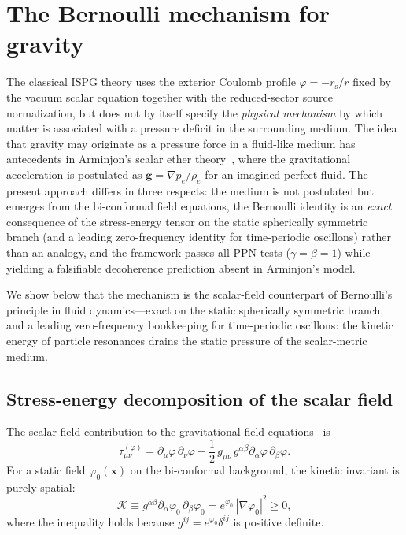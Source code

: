 \documentclass[aps,prd,onecolumn,superscriptaddress,nofootinbib,showpacs,12pt,notitlepage]{revtex4-2}
\newcommand{\rs}{r_{\mathrm{s}}}
\begin{document}
\section{The Bernoulli mechanism for gravity}\label{sec:bernoulli_identity}

The classical ISPG theory uses the exterior Coulomb profile
$\varphi = -\rs/r$ fixed by the vacuum scalar equation together
with the reduced-sector source normalization, but does not by
itself specify the \emph{physical mechanism} by which matter is
associated with a pressure deficit in the surrounding medium.  The
idea that gravity may originate as a
pressure force in a fluid-like medium has antecedents in
Arminjon's scalar ether theory~\cite{Arminjon2012}, where
the gravitational acceleration is postulated as
$\mathbf{g} = \nabla p_e/\rho_e$ for an imagined perfect fluid.
The present approach differs in three respects: the medium is
not postulated but emerges from the bi-conformal field equations,
the Bernoulli identity is an \emph{exact} consequence of the
stress-energy tensor on the static spherically symmetric branch
(and a leading zero-frequency identity for time-periodic
oscillons) rather than an analogy, and the framework passes all
PPN tests ($\gamma = \beta = 1$) while yielding a falsifiable
decoherence prediction absent in Arminjon's model.

We show below that the mechanism is the scalar-field
counterpart of Bernoulli's principle in fluid dynamics---exact
on the static spherically symmetric branch, and a leading
zero-frequency bookkeeping for time-periodic oscillons: the
kinetic energy of particle resonances drains the static
pressure of the scalar-metric medium.

\subsection{Stress-energy decomposition of the scalar field}
\label{sec:stress_energy}

The scalar-field contribution to the gravitational field
equations~\cite{Lotishvili2026} is
\begin{equation}\label{eq:tau_munu}
  \tau_{\mu\nu}^{(\varphi)}
  = \partial_\mu\varphi\,\partial_\nu\varphi
  - \frac{1}{2}\,g_{\mu\nu}\,
    g^{\alpha\beta}\partial_\alpha\varphi\,\partial_\beta\varphi.
\end{equation}
For a static field $\varphi_0(\mathbf{x})$ on the bi-conformal
background, the kinetic invariant is purely spatial:
\begin{equation}\label{eq:X_static}
  \mathcal{K} \equiv g^{\alpha\beta}\partial_\alpha\varphi_0\,
  \partial_\beta\varphi_0
  = e^{\varphi_0}\,|\nabla\varphi_0|^{2} \geq 0,
\end{equation}
where the inequality holds because $g^{ij} = e^{\varphi_0}\delta^{ij}$
is positive definite.
\end{document}
